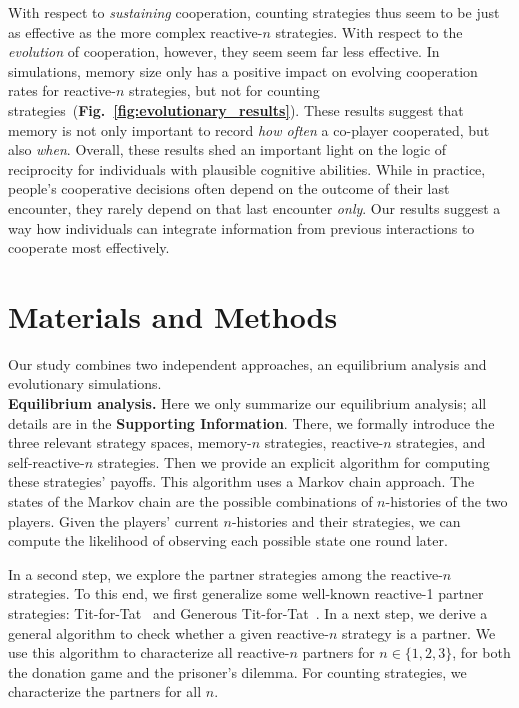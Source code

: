 \documentclass[9pt,twocolumn,twoside]{pnas-new}
\newcommand{\figref}[1]{{\textbf{Fig.~\ref{#1}}}}
\def\SI{\textbf{Supporting Information}}
\begin{document}
With respect to {\it sustaining} cooperation, counting strategies thus seem to be just as effective as the more complex reactive-$n$ strategies.
With respect to the {\it evolution} of cooperation, however, they seem seem far less effective. 
In simulations, memory size only has a positive impact on evolving cooperation rates for reactive-$n$ strategies, but not for counting strategies~(\figref{fig:evolutionary_results}). 
These results suggest that memory is not only important to record {\it how often} a co-player cooperated, but also {\it when}. 
Overall, these results shed an important light on the logic of reciprocity for individuals with plausible cognitive abilities. 
While in practice, people's cooperative decisions often depend on the outcome of their last encounter, they rarely depend on that last encounter {\it only}. 
Our results suggest a way how individuals can integrate information from previous interactions to cooperate most effectively.  


\section*{Materials and Methods}\label{section:materials_and_methods}

Our study combines two independent approaches, an equilibrium analysis and evolutionary simulations.\\

\noindent
{\bf Equilibrium analysis.} Here we only summarize our equilibrium analysis; all details are in the \SI. 
There, we formally introduce the three relevant strategy spaces, memory-$n$ strategies, reactive-$n$ strategies, and self-reactive-$n$ strategies. 
Then we provide an explicit algorithm for computing these strategies' payoffs. 
This algorithm uses a Markov chain approach. 
The states of the Markov chain are the possible combinations of $n$-histories of the two players. 
Given the players' current $n$-histories and their strategies, we can compute the likelihood of observing each possible state one round later. 

In a second step, we explore the partner strategies among the reactive-$n$ strategies. 
To this end, we first generalize some well-known reactive-1 partner strategies: Tit-for-Tat~\citep{axelrod:AAAS:1981} and Generous Tit-for-Tat~\citep{nowak:Nature:1992,molander:jcr:1985}. 
In a next step, we derive a general algorithm to check whether a given reactive-$n$ strategy is a partner. 
We use this algorithm to characterize all reactive-$n$ partners for $n\!\in\!\{1,2,3\}$, for both the donation game and the prisoner's dilemma. 
For counting strategies, we characterize the partners for all $n$.\\
\end{document}
